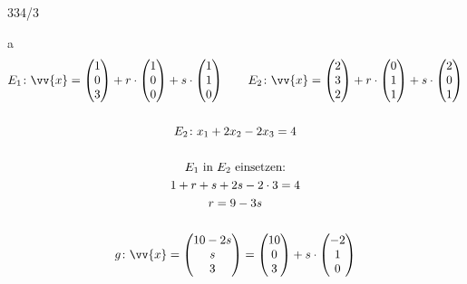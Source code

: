 \begin{exercise}{334/3}
  \item [a]
  \begin{gather*}
    E_1 \colon \vv{x} = \begin{pmatrix}1 \\ 0 \\ 3\end{pmatrix} + r \cdot \begin{pmatrix}1 \\ 0 \\ 0\end{pmatrix} + s \cdot \begin{pmatrix}1 \\ 1 \\ 0\end{pmatrix} \qquad E_2 \colon \vv{x} = \begin{pmatrix}2 \\ 3 \\ 2\end{pmatrix} + r \cdot \begin{pmatrix}0 \\ 1 \\ 1\end{pmatrix} + s \cdot \begin{pmatrix}2 \\ 0 \\ 1\end{pmatrix} \\\\
    E_2 \colon x_1 + 2x_2 - 2x_3 = 4 \\\\
    \text{$E_1$ in $E_2$ einsetzen:} \\
    1 + r + s + 2s - 2 \cdot 3 = 4 \\
    r = 9 - 3s \\\\
    g \colon \vv{x} = \begin{pmatrix}10 - 2s \\ s \\ 3\end{pmatrix} = \begin{pmatrix}10 \\ 0 \\ 3\end{pmatrix} + s \cdot \begin{pmatrix}-2 \\ 1 \\ 0\end{pmatrix}
  \end{gather*}
\end{exercise}
